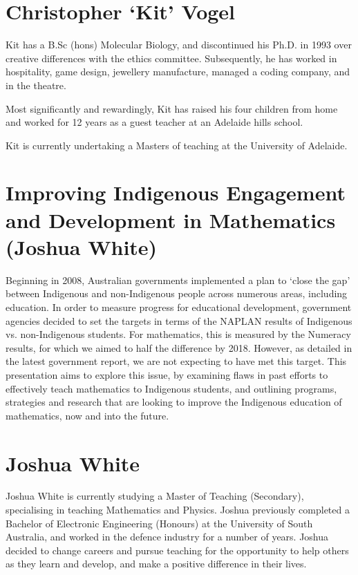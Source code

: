 \documentclass[twoside,12pt,a4paper,notitlepage]{memoir}
\begin{document}
\section*{Christopher `Kit' Vogel}

Kit has a B.Sc (hons) Molecular Biology, and discontinued his Ph.D. in 1993 over creative differences with the ethics committee. Subsequently, he has worked in hospitality, game design, jewellery manufacture, managed a coding company, and in the theatre.

Most significantly and rewardingly, Kit has raised his four children from home and worked for 12 years as a guest teacher at an Adelaide hills school.

Kit is currently undertaking a Masters of teaching at the University of Adelaide.



\pagebreak
\section*{Improving Indigenous Engagement and Development in Mathematics (Joshua White)}
\label{aut:white}

Beginning in 2008, Australian governments implemented a plan to ‘close the gap’ between Indigenous and non-Indigenous people across numerous areas, including education. In order to measure progress for educational development, government agencies decided to set the targets in terms of the NAPLAN results of Indigenous vs. non-Indigenous students. For mathematics, this is measured by the Numeracy results, for which we aimed to half the difference by 2018. However, as detailed in the latest government report, we are not expecting to have met this target.
This presentation aims to explore this issue, by examining flaws in past efforts to effectively teach mathematics to Indigenous students, and outlining programs, strategies and research that are looking to improve the Indigenous education of mathematics, now and into the future.

\section*{Joshua White}

Joshua White is currently studying a Master of Teaching (Secondary), specialising in teaching Mathematics and Physics. Joshua previously completed a Bachelor of Electronic Engineering (Honours) at the University of South Australia, and worked in the defence industry for a number of years. Joshua decided to change careers and pursue teaching for the opportunity to help others as they learn and develop, and make a positive difference in their lives.
\end{document}
